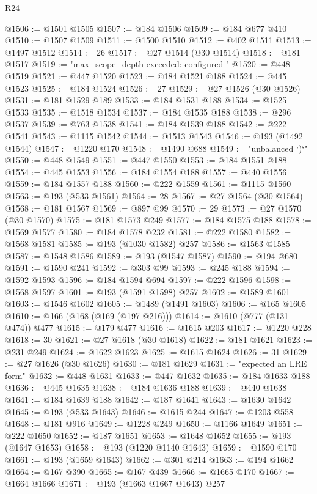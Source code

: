 \begin{lexlean}{R24}
\begin{coremodule}
@1506 := @1501 @1505
@1507 := @184 @1506
@1509 := @184 @677 @410
@1510 := @1507 @1509
@1511 := @1500 @1510
@1512 := @402 @1511
@1513 := @1497 @1512
@1514 := 26
@1517 := @27 @1514 (@30 @1514)
@1518 := @181 @1517
@1519 := "max_scope_depth exceeded: configured "
@1520 := @448 @1519
@1521 := @447 @1520
@1523 := @184 @1521 @188
@1524 := @445 @1523
@1525 := @184 @1524
@1526 := 27
@1529 := @27 @1526 (@30 @1526)
@1531 := @181 @1529 @189
@1533 := @184 @1531 @188
@1534 := @1525 @1533
@1535 := @1518 @1534
@1537 := @184 @1535 @188
@1538 := @296 @1537
@1539 := @763 @1538
@1541 := @184 @1539 @188
@1542 := @222 @1541
@1543 := @1115 @1542
@1544 := @1513 @1543
@1546 := @193 (@1492 @1544)
@1547 := @1220 @170
@1548 := @1490 @688
@1549 := "unbalanced `)`"
@1550 := @448 @1549
@1551 := @447 @1550
@1553 := @184 @1551 @188
@1554 := @445 @1553
@1556 := @184 @1554 @188
@1557 := @440 @1556
@1559 := @184 @1557 @188
@1560 := @222 @1559
@1561 := @1115 @1560
@1563 := @193 (@533 @1561)
@1564 := 28
@1567 := @27 @1564 (@30 @1564)
@1568 := @181 @1567
@1569 := @897 @99
@1570 := 29
@1573 := @27 @1570 (@30 @1570)
@1575 := @181 @1573 @249
@1577 := @184 @1575 @188
@1578 := @1569 @1577
@1580 := @184 @1578 @232
@1581 := @222 @1580
@1582 := @1568 @1581
@1585 := @193 (@1030 @1582) @257
@1586 := @1563 @1585
@1587 := @1548 @1586
@1589 := @193 (@1547 @1587)
@1590 := @194 @680
@1591 := @1590 @241
@1592 := @303 @99
@1593 := @245 @188
@1594 := @1592 @1593
@1596 := @184 @1594 @694
@1597 := @222 @1596
@1598 := @1568 @1597
@1601 := @193 (@1591 @1598) @257
@1602 := @1589 @1601
@1603 := @1546 @1602
@1605 := @1489 (@1491 @1603)
@1606 := @165 @1605
@1610 := @166 (@168 (@169 (@197 @216)))
@1614 := @1610 (@777 (@131 @474)) @477
@1615 := @179 @477
@1616 := @1615 @203
@1617 := @1220 @228
@1618 := 30
@1621 := @27 @1618 (@30 @1618)
@1622 := @181 @1621
@1623 := @231 @249
@1624 := @1622 @1623
@1625 := @1615 @1624
@1626 := 31
@1629 := @27 @1626 (@30 @1626)
@1630 := @181 @1629
@1631 := "expected an LRE form"
@1632 := @448 @1631
@1633 := @447 @1632
@1635 := @184 @1633 @188
@1636 := @445 @1635
@1638 := @184 @1636 @188
@1639 := @440 @1638
@1641 := @184 @1639 @188
@1642 := @187 @1641
@1643 := @1630 @1642
@1645 := @193 (@533 @1643)
@1646 := @1615 @244
@1647 := @1203 @558
@1648 := @181 @916
@1649 := @1228 @249
@1650 := @1166 @1649
@1651 := @222 @1650
@1652 := @187 @1651
@1653 := @1648 @1652
@1655 := @193 (@1647 @1653)
@1658 := @193 (@1220 @1140 @1643)
@1659 := @1590 @170
@1661 := @193 (@1659 @1643)
@1662 := @301 @214
@1663 := @194 @1662
@1664 := @167 @390
@1665 := @167 @439
@1666 := @1665 @170
@1667 := @1664 @1666
@1671 := @193 (@1663 @1667 @1643) @257

\end{coremodule}
\end{lexlean}
